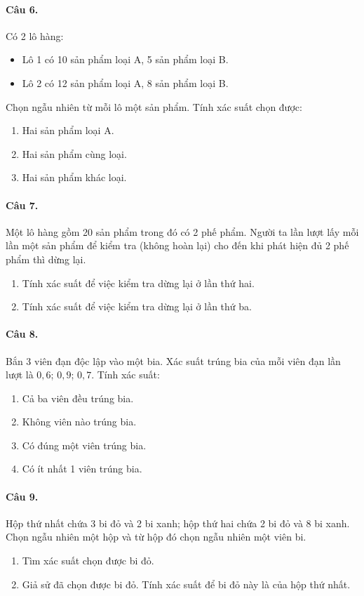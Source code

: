 \paragraph{Câu 6.} Có 2 lô hàng:
\begin{itemize}
    \item Lô 1 có 10 sản phẩm loại A, 5 sản phẩm loại B.
    \item Lô 2 có 12 sản phẩm loại A, 8 sản phẩm loại B.
\end{itemize}
Chọn ngẫu nhiên từ mỗi lô một sản phẩm. Tính xác suất chọn được:
\begin{enumerate}[label=\arabic*.]
    \item Hai sản phẩm loại A.
    \item Hai sản phẩm cùng loại.
    \item Hai sản phẩm khác loại.
\end{enumerate}

\paragraph{Câu 7.} Một lô hàng gồm 20 sản phẩm trong đó có 2 phế phẩm. Người ta lần lượt lấy mỗi lần một sản phẩm để kiểm tra (không hoàn lại) cho đến khi phát hiện đủ 2 phế phẩm thì dừng lại.
\begin{enumerate}[label=\alph*/]
    \item Tính xác suất để việc kiểm tra dừng lại ở lần thứ hai.
    \item Tính xác suất để việc kiểm tra dừng lại ở lần thứ ba.
\end{enumerate}

\paragraph{Câu 8.} Bắn 3 viên đạn độc lập vào một bia. Xác suất trúng bia của mỗi viên đạn lần lượt là $0{,}6$; $0{,}9$; $0{,}7$. Tính xác suất:
\begin{enumerate}[label=\alph*/]
    \item Cả ba viên đều trúng bia.
    \item Không viên nào trúng bia.
    \item Có đúng một viên trúng bia.
    \item Có ít nhất 1 viên trúng bia.
\end{enumerate}

\paragraph{Câu 9.} Hộp thứ nhất chứa 3 bi đỏ và 2 bi xanh; hộp thứ hai chứa 2 bi đỏ và 8 bi xanh. Chọn ngẫu nhiên một hộp và từ hộp đó chọn ngẫu nhiên một viên bi.
\begin{enumerate}[label=\arabic*.]
    \item Tìm xác suất chọn được bi đỏ.
    \item Giả sử đã chọn được bi đỏ. Tính xác suất để bi đỏ này là của hộp thứ nhất.
\end{enumerate}

